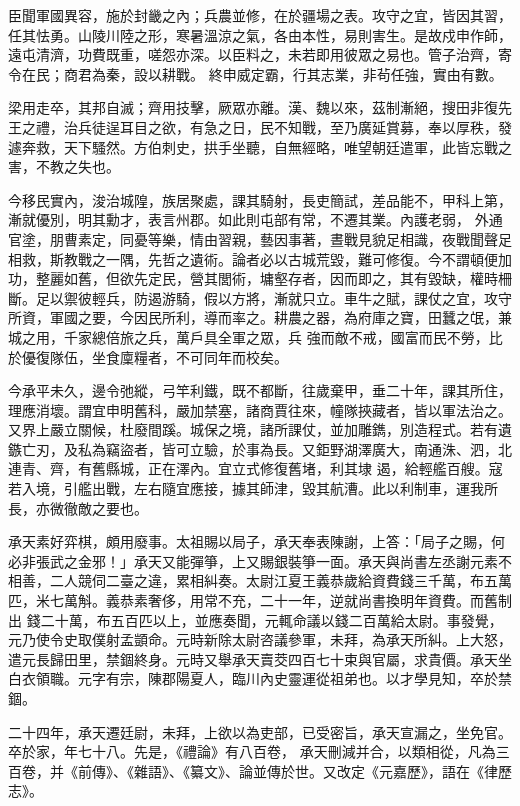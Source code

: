 \begin{pinyinscope}
 臣聞軍國異容，施於封畿之內；兵農並修，在於疆場之表。攻守之宜，皆因其習，任其怯勇。山陵川陸之形，寒暑溫涼之氣，各由本性，易則害生。是故戍申作師，遠屯清濟，功費既重，嗟怨亦深。以臣料之，未若即用彼眾之易也。管子治齊，寄令在民；商君為秦，設以耕戰。
 終申威定霸，行其志業，非茍任強，實由有數。



 梁用走卒，其邦自滅；齊用技擊，厥眾亦離。漢、魏以來，茲制漸絕，搜田非復先王之禮，治兵徒逞耳目之欲，有急之日，民不知戰，至乃廣延賞募，奉以厚秩，發遽奔救，天下騷然。方伯刺史，拱手坐聽，自無經略，唯望朝廷遣軍，此皆忘戰之害，不教之失也。



 今移民實內，浚治城隍，族居聚處，課其騎射，長吏簡試，差品能不，甲科上第，漸就優別，明其勳才，表言州郡。如此則屯部有常，不遷其業。內護老弱，
 外通官塗，朋曹素定，同憂等樂，情由習親，藝因事著，晝戰見貌足相識，夜戰聞聲足相救，斯教戰之一隅，先哲之遺術。論者必以古城荒毀，難可修復。今不謂頓便加功，整麗如舊，但欲先定民，營其閭術，墉壑存者，因而即之，其有毀缺，權時柵斷。足以禦彼輕兵，防遏游騎，假以方將，漸就只立。車牛之賦，課仗之宜，攻守所資，軍國之要，今因民所利，導而率之。耕農之器，為府庫之寶，田蠶之氓，兼城之用，千家總倍旅之兵，萬戶具全軍之眾，兵
 強而敵不戒，國富而民不勞，比於優復隊伍，坐食廩糧者，不可同年而校矣。



 今承平未久，邊令弛縱，弓竿利鐵，既不都斷，往歲棄甲，垂二十年，課其所住，理應消壞。謂宜申明舊科，嚴加禁塞，諸商賈往來，幢隊挾藏者，皆以軍法治之。又界上嚴立關候，杜廢間蹊。城保之境，諸所課仗，並加雕鐫，別造程式。若有遺鏃亡刃，及私為竊盜者，皆可立驗，於事為長。又鉅野湖澤廣大，南通洙、泗，北連青、齊，有舊縣城，正在澤內。宜立式修復舊堵，利其埭
 遏，給輕艦百艘。寇若入境，引艦出戰，左右隨宜應接，據其師津，毀其航漕。此以利制車，運我所長，亦微徹敵之要也。



 承天素好弈棋，頗用廢事。太祖賜以局子，承天奉表陳謝，上答：「局子之賜，何必非張武之金邪！」承天又能彈箏，上又賜銀裝箏一面。承天與尚書左丞謝元素不相善，二人競伺二臺之違，累相糾奏。太尉江夏王義恭歲給資費錢三千萬，布五萬匹，米七萬斛。義恭素奢侈，用常不充，二十一年，逆就尚書換明年資費。而舊制出
 錢二十萬，布五百匹以上，並應奏聞，元輒命議以錢二百萬給太尉。事發覺，元乃使令史取僕射孟顗命。元時新除太尉咨議參軍，未拜，為承天所糾。上大怒，遣元長歸田里，禁錮終身。元時又舉承天賣茭四百七十束與官屬，求貴價。承天坐白衣領職。元字有宗，陳郡陽夏人，臨川內史靈運從祖弟也。以才學見知，卒於禁錮。



 二十四年，承天遷廷尉，未拜，上欲以為吏部，已受密旨，承天宣漏之，坐免官。卒於家，年七十八。先是，《禮論》有八百卷，
 承天刪減并合，以類相從，凡為三百卷，并《前傳》、《雜語》、《纂文》、論並傳於世。又改定《元嘉歷》，語在《律歷志》。




\end{pinyinscope}
